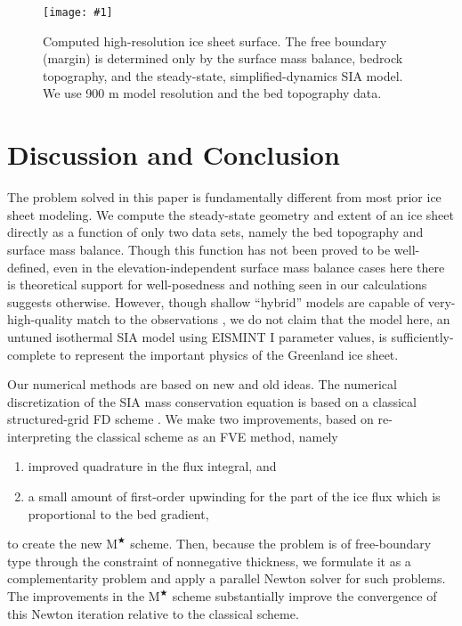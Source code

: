 \documentclass[twocolumn,a4paper]{igs}
\newcommand{\onecol}[1]{\texttt{[image: \#1]}}
\newcommand{\Mstar}{$\text{M}^{\bigstar}$\xspace}
\begin{document}
\begin{figure}[ht]
\onecol{grnwinset.pdf}
\caption{Computed high-resolution ice sheet surface.  The free boundary (margin) is determined only by the surface mass balance, bedrock topography, and the steady-state, simplified-dynamics SIA model.  We use 900 m model resolution and the \MCB bed topography data.}
\label{fig:grnwinset}
\end{figure}


\section{Discussion and Conclusion}

The problem solved in this paper is fundamentally different from most prior ice sheet modeling.  We compute the steady-state geometry and extent of an ice sheet directly as a function of only two data sets, namely the bed topography and surface mass balance.  Though this function has not been proved to be well-defined, even in the elevation-independent surface mass balance cases here \citep[compare][]{Jouvetetal2011} there is theoretical support for well-posedness \citep{JouvetBueler2012} and nothing seen in our calculations suggests otherwise.  However, though shallow ``hybrid'' models are capable of very-high-quality match to the observations \citep{Aschwandenetal2015}, we do not claim that the model here, an untuned isothermal SIA model using EISMINT I parameter values, is sufficiently-complete to represent the important physics of the Greenland ice sheet.

Our numerical methods are based on new and old ideas.  The numerical discretization of the SIA mass conservation equation is based on a classical structured-grid FD scheme \citep{Mahaffy1976}.  We make two improvements, based on re-interpreting the classical scheme as an FVE method, namely
\renewcommand{\labelenumi}{\emph{(\roman{enumi})}}
\begin{enumerate}
\item improved quadrature in the flux integral, and
\item a small amount of first-order upwinding for the part of the ice flux which is proportional to the bed gradient,
\end{enumerate}
to create the new \Mstar scheme.  Then, because the problem is of free-boundary type through the constraint of nonnegative thickness, we formulate it as a complementarity problem and apply a parallel Newton solver for such problems.  The improvements in the \Mstar scheme substantially improve the convergence of this Newton iteration relative to the classical scheme.
\end{document}
